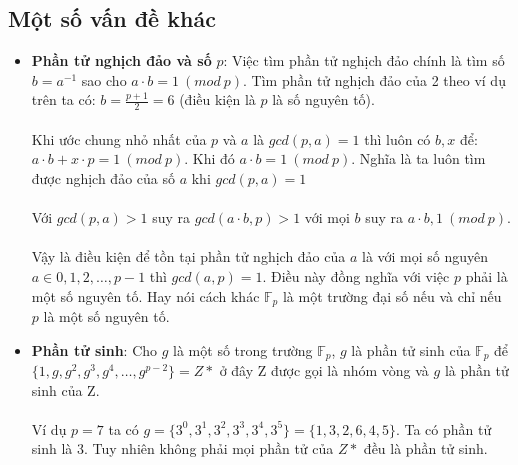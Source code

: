 \documentclass[a4paper,12pt]{report}
\begin{document}
\subsection*{Một số vấn đề khác}
\begin{itemize}
\item \textbf{Phần tử nghịch đảo và số} $p$: Việc tìm phần tử nghịch đảo chính là tìm số $b = a^{-1}$ sao cho $a \cdot b = 1 \ (mod \ p)$. Tìm phần tử nghịch đảo của 2 theo ví dụ trên ta có: $\displaystyle b = \frac{p+1}{2} = 6$ (điều kiện là $p$ là số nguyên tố). \\ \\
Khi ước chung nhỏ nhất của $p$ và $a$ là $gcd(p, a) = 1$ thì luôn có $b, x$ để: $a \cdot b + x \cdot p = 1 \ (mod \ p)$. Khi đó $a \cdot b = 1 \ (mod \ p)$. Nghĩa là ta luôn tìm được nghịch đảo của số $a$ khi $gcd(p, a) = 1$ \\ \\
Với $gcd(p, a) > 1$ suy ra $gcd(a \cdot b, p) > 1$ với mọi $b$ suy ra $a \cdot b , 1 \ (mod \ p)$. \\ \\
Vậy là điều kiện để tồn tại phần tử nghịch đảo của $a$ là với mọi số nguyên $a \in {0, 1, 2, \ldots , p-1}$ thì $gcd(a, p) = 1$. Điều này đồng nghĩa với việc $p$ phải là một số nguyên tố. Hay nói cách khác $\mathbb{F}_p$ là một trường đại số nếu và chỉ nếu $p$ là một số nguyên tố.
\item \textbf{Phần tử sinh}: Cho $g$ là một số trong trường $\mathbb{F}_p$, $g$ là phần tử sinh của $\mathbb{F}_p$ để $\{1, g, g^2, g^3, g^4, \ldots, g^{p-2}\} = Z*$ ở đây Z được gọi là nhóm vòng và $g$ là phần tử sinh của Z. \\ \\
Ví dụ $p = 7$ ta có $g = \{ 3^0, 3^1, 3^2, 3^3, 3^4, 3^5 \} = \{1, 3, 2, 6, 4, 5\}$. Ta có phần tử sinh là 3. Tuy nhiên không phải mọi phần tử của $Z*$ đều là phần tử sinh.
\end{itemize}
\end{document}
